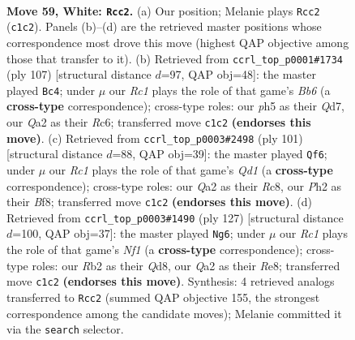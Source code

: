 \documentclass[11pt]{article}
\begin{document}
\clearpage

\begin{figure}[p]\centering
\begin{subfigure}{0.46\textwidth}\centering
\resizebox{\linewidth}{!}{%
\newchessgame
\chessboard[
  setfen={n5k1/3qbr2/8/Prp2p1p/3p1Pp1/8/QR1BP2P/2RN2K1 w - - 0 59},
  showmover=false,
  pgfstyle=straightmove, color=movearrow, markmove={c1-c2}
]}
\caption{}
\end{subfigure}\hfill
\begin{subfigure}{0.46\textwidth}\centering
\resizebox{\linewidth}{!}{%
\newchessgame
\chessboard[
  setfen={6k1/3q2p1/2rrpp1p/8/p2P4/PbB1RP1P/1P4P1/2R2QK1 b - - 17 54},
  showmover=false,
  pgfstyle=straightmove, color=movearrow, markmove={b3-c4}
]}
\caption{}
\end{subfigure}
\\[4pt]
\begin{subfigure}{0.46\textwidth}\centering
\resizebox{\linewidth}{!}{%
\newchessgame
\chessboard[
  setfen={1rrq1bk1/5pp1/2Bp2np/3P4/4PP2/P4Q2/2R5/2R1B2K b - - 13 51},
  showmover=false,
  pgfstyle=straightmove, color=movearrow, markmove={d8-f6}
]}
\caption{}
\end{subfigure}\hfill
\begin{subfigure}{0.46\textwidth}\centering
\resizebox{\linewidth}{!}{%
\newchessgame
\chessboard[
  setfen={3qrnk1/2b2p2/8/p3P1pR/1p1BQ1P1/1P1N1P2/P2K4/8 b - - 11 64},
  showmover=false,
  pgfstyle=straightmove, color=movearrow, markmove={f8-g6}
]}
\caption{}
\end{subfigure}
\caption{\textbf{Move 59, White: \texttt{Rcc2}.} (a) Our position; Melanie plays \texttt{Rcc2} (\texttt{c1c2}). Panels (b)--(d) are the retrieved master positions whose correspondence most drove this move (highest QAP objective among those that transfer to it). (b) Retrieved from \texttt{ccrl\_top\_p0001\#1734} (ply 107) [structural distance $d$=97, QAP obj=48]: the master played \texttt{Bc4}; under $\mu$ our \emph{Rc1} plays the role of that game's \emph{Bb6} (a \textbf{cross-type} correspondence); cross-type roles: our \emph{p}h5 as their \emph{Q}d7, our \emph{Q}a2 as their \emph{R}c6; transferred move \texttt{c1c2} \textbf{(endorses this move)}. (c) Retrieved from \texttt{ccrl\_top\_p0003\#2498} (ply 101) [structural distance $d$=88, QAP obj=39]: the master played \texttt{Qf6}; under $\mu$ our \emph{Rc1} plays the role of that game's \emph{Qd1} (a \textbf{cross-type} correspondence); cross-type roles: our \emph{Q}a2 as their \emph{R}c8, our \emph{P}h2 as their \emph{B}f8; transferred move \texttt{c1c2} \textbf{(endorses this move)}. (d) Retrieved from \texttt{ccrl\_top\_p0003\#1490} (ply 127) [structural distance $d$=100, QAP obj=37]: the master played \texttt{Ng6}; under $\mu$ our \emph{Rc1} plays the role of that game's \emph{Nf1} (a \textbf{cross-type} correspondence); cross-type roles: our \emph{R}b2 as their \emph{Q}d8, our \emph{Q}a2 as their \emph{R}e8; transferred move \texttt{c1c2} \textbf{(endorses this move)}. Synthesis: 4 retrieved analogs transferred to \texttt{Rcc2} (summed QAP objective 155, the strongest correspondence among the candidate moves); Melanie committed it via the \texttt{search} selector.}
\label{fig:thought-m116}
\end{figure}
\end{document}
